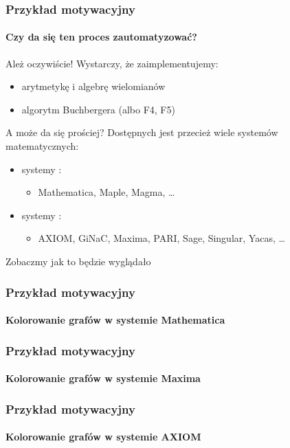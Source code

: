 \documentclass{beamer}
\begin{document}
\begin{frame}
    \frametitle{Przykład motywacyjny}
    \framesubtitle{Czy da się ten proces zautomatyzować?}

    Ależ oczywiście! Wystarczy, że zaimplementujemy:
    \begin{itemize}
        \item arytmetykę i algebrę wielomianów
        \item algorytm Buchbergera (albo F4, F5)
    \end{itemize}
    \pause
    A może da się prościej? \newline
    \pause
    Dostępnych jest przecież wiele systemów matematycznych:
    \pause
    \begin{itemize}
        \item systemy :
            \begin{itemize}
                \item Mathematica, Maple, Magma, \ldots
            \end{itemize}
            \pause
        \item systemy :
            \begin{itemize}
                \item AXIOM, GiNaC, Maxima, PARI, Sage, Singular, Yacas, \ldots
            \end{itemize}
    \end{itemize}
    \pause
    Zobaczmy jak to będzie wyglądało \structure{\ldots}
\end{frame}

\begin{frame}[fragile]
    \frametitle{Przykład motywacyjny}
    \framesubtitle{Kolorowanie grafów w systemie Mathematica}

    
\end{frame}

\begin{frame}[fragile]
    \frametitle{Przykład motywacyjny}
    \framesubtitle{Kolorowanie grafów w systemie Maxima}

    
\end{frame}

\begin{frame}[fragile]
    \frametitle{Przykład motywacyjny}
    \framesubtitle{Kolorowanie grafów w systemie AXIOM}

    
\end{frame}
\end{document}
